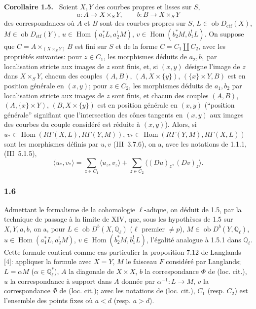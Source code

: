 \documentclass[11pt]{article}
\newenvironment{statement}[1]{\par\medskip\noindent\textbf{#1.}\ }{\par\medskip}
\DeclareMathOperator{\Hom}{Hom}
\newcommand{\ob}{\operatorname{ob}}
\providecommand{\ctf}{\mathrm{ctf}}
\begin{document}
\begin{statement}{Corollaire 1.5}
Soient $X,Y$ des courbes propres et lisses sur $S$,
\[
a:A\longrightarrow X\times_S Y,
\qquad
b:B\longrightarrow X\times_S Y
\]
des correspondances où $A$ et $B$ sont des courbes propres sur $S$, $L\in\ob D_{\ctf}(X)$, $M\in\ob D_{\ctf}(Y)$, $u\in\Hom(a_1^*L,a_2^!M)$, $v\in\Hom(b_2^*M,b_1^!L)$. On suppose que $C=A\times_{(X\times_S Y)}B$ est fini sur $S$ et de la forme $C=C_1\amalg C_2$, avec les propriétés suivantes: pour $z\in C_1$, les morphismes déduits de $a_2,b_1$ par localisation stricte aux images de $z$ sont finis, et, si $(x,y)$ désigne l'image de $z$ dans $X\times_S Y$, chacun des couples $(A,B)$, $(A,X\times\{y\})$, $(\{x\}\times Y,B)$ est en position générale en $(x,y)$; pour $z\in C_2$, les morphismes déduits de $a_1,b_2$ par localisation stricte aux images de $z$ sont finis, et chacun des couples $(A,B)$, $(A,\{x\}\times Y)$, $(B,X\times\{y\})$ est en position générale en $(x,y)$ (``position générale'' signifiant que l'intersection des cônes tangents en $(x,y)$ aux images des courbes du couple considéré est réduite à $(x,y)$). Alors, si $u_*\in\Hom(R\Gamma(X,L),R\Gamma(Y,M))$, $v_*\in\Hom(R\Gamma(Y,M),R\Gamma(X,L))$ sont les morphismes définis par $u,v$ (III~3.7.6), on a, avec les notations de 1.1.1, (III~5.1.5),
\begin{equation}\tag{1.5.1}
\langle u_*,v_*\rangle=\sum_{z\in C_1}\langle u_z,v_z\rangle+\sum_{z\in C_2}\langle (Du)_z,(Dv)_z\rangle.
\end{equation}
\end{statement}

\subsubsection*{1.6}
Admettant le formalisme de la cohomologie $\ell$-adique, on déduit de 1.5, par la technique de passage à la limite de XIV, que, sous les hypothèses de 1.5 sur $X,Y,a,b$, on a, pour $L\in\ob D^b(X,\mathbb Q_\ell)$ ($\ell$ premier $\ne p$), $M\in\ob D^b(Y,\mathbb Q_\ell)$, $u\in\Hom(a_1^*L,a_2^!M)$, $v\in\Hom(b_2^*M,b_1^!L)$, l'égalité analogue à 1.5.1 dans $\mathbb Q_\ell$. Cette formule contient comme cas particulier la proposition 7.12 de Langlands [4]: appliquer la formule avec $X=Y$, $M$ le faisceau $F$ considéré par Langlands; $L=\alpha M$ ($\alpha\in\mathbb Q_\ell^*$), $A$ la diagonale de $X\times X$, $b$ la correspondance $\Phi$ de (loc. cit.), $u$ la correspondance à support dans $A$ donnée par $\alpha^{-1}:L\to M$, $v$ la correspondance $\Phi$ de (loc. cit.); avec les notations de (loc. cit.), $C_1$ (resp. $C_2$) est l'ensemble des points fixes où $a<d$ (resp. $a>d$).
\end{document}
